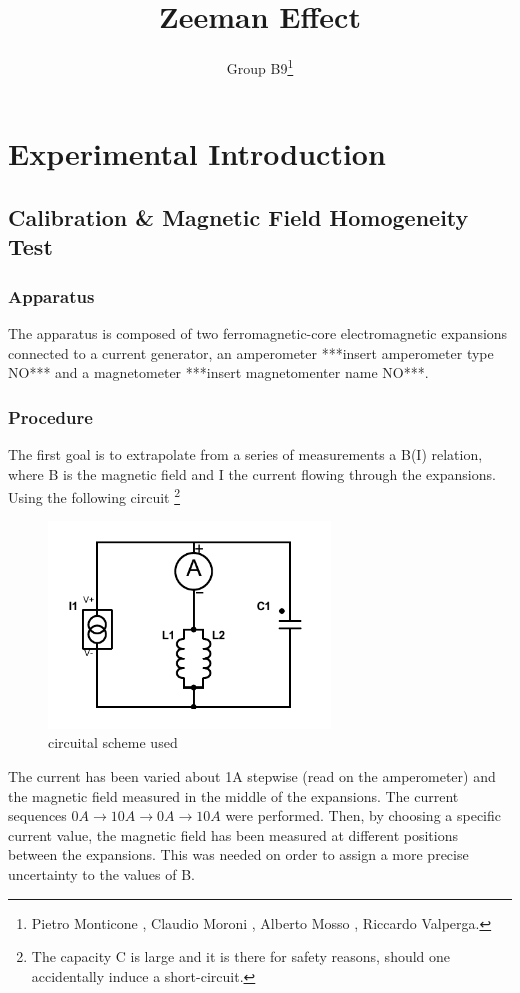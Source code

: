 \documentclass[a4paper,12pt,abstracton]{scrartcl}
\title{Zeeman Effect}
\author{Group B9\footnote{Pietro Monticone , Claudio Moroni , Alberto Mosso , Riccardo Valperga.}}
\begin{document}
\section{Experimental Introduction}\label{ExpIntro}
\subsection{Calibration \& Magnetic Field Homogeneity Test}
\subsubsection{Apparatus}
The apparatus is composed of two ferromagnetic-core electromagnetic expansions connected to a current generator, an amperometer ***insert amperometer type NO*** and a magnetometer ***insert magnetomenter name NO***.
\subsubsection{Procedure}
The first goal is to extrapolate from a series of measurements a B(I) relation, where B is the magnetic field and I the current flowing through the expansions. 
Using the following circuit \footnote{The capacity C is large and it is there for safety reasons, should one accidentally induce a short-circuit.}
\begin{figure}[H]
\begin{center}
\includegraphics[trim=0cm 0cm 0cm 0cm,clip,width=7.5cm,keepaspectratio]{images/circuito.pdf} 
\caption{circuital scheme used}
\end{center} 
\end{figure}
The current has been varied about 1A stepwise (read on the amperometer) and the magnetic field measured in the middle of the expansions. The current sequences $0A \longrightarrow 10A \longrightarrow 0A \longrightarrow 10A$ were performed.
Then, by choosing a specific current value, the magnetic field has been measured at different positions between the expansions. This was needed on order to assign a more precise uncertainty to the values of B.
\end{document}
